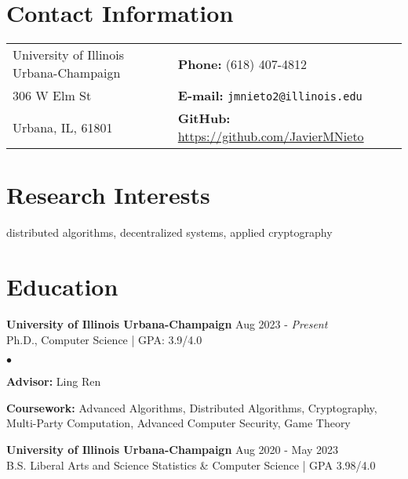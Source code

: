 \documentclass[margin,line]{res}
\newenvironment{list1}{
  \begin{list}{\ding{113}}{%
      \setlength{\itemsep}{0in}
      \setlength{\parsep}{0in} \setlength{\parskip}{0in}
      \setlength{\topsep}{0in} \setlength{\partopsep}{0in} 
      \setlength{\leftmargin}{0.17in}}}{\end{list}}
\newenvironment{list2}{
  \begin{list}{$\bullet$}{%
      \setlength{\itemsep}{0in}
      \setlength{\parsep}{0in} \setlength{\parskip}{0in}
      \setlength{\topsep}{0in} \setlength{\partopsep}{0in} 
      \setlength{\leftmargin}{0.2in}}}{\end{list}}
\begin{document}

\begin{resume}
  \section{\sc Contact Information}
  \vspace{.05in}
  \begin{tabular}{@{}p{3in}p{4in}}
    University of Illinois Urbana-Champaign & {\bf Phone:}   (618) 407-4812                       \\
    306 W Elm St                            & {\bf E-mail:}  {\tt jmnieto2@illinois.edu}          \\
    Urbana, IL, 61801                       & {\bf GitHub:} \url{https://github.com/JavierMNieto} \\
  \end{tabular}


  \section{\sc Research Interests}
  distributed algorithms, decentralized systems, applied cryptography

  \section{\sc Education}
   {\bf University of Illinois Urbana-Champaign} \hfill Aug 2023 - \emph{Present}\\
  Ph.D., Computer Science | GPA: 3.9/4.0
  \begin{list2}
    \item {\bf \small Advisor:}  Ling Ren
    \item {\bf \small Coursework:} Advanced Algorithms, Distributed Algorithms, Cryptography, Multi-Party Computation, Advanced Computer Security, Game Theory
  \end{list2}

  {\bf University of Illinois Urbana-Champaign} \hfill Aug 2020 - May 2023\\
  B.S. Liberal Arts and Science Statistics \& Computer Science | GPA 3.98/4.0


\end{resume}
\end{document}
